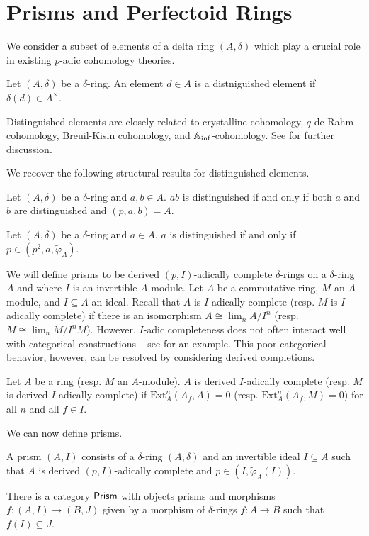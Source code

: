 \section{Prisms and Perfectoid Rings}\label{sec: prisms}
We consider a subset of elements of a delta ring $(A,\delta)$ which play a crucial role in existing $p$-adic cohomology theories. 
\begin{definition}\label{def: distinguished element}
    Let $(A,\delta)$ be a $\delta$-ring. An element $d\in A$ is a distniguished element if $\delta(d)\in A^{\times}$. 
\end{definition}
Distinguished elements are closely related to crystalline cohomology, $q$-de Rahm cohomology, Breuil-Kisin cohomology, and $\mathbb{A}_{\inf}$-cohomology. See \cite[Ex. 5.13-16]{Kedlaya} for further discussion. 

We recover the following structural results for distinguished elements. 
\begin{lemma}\label{lem: product distinguished iff factors distinguished}
    Let $(A,\delta)$ be a $\delta$-ring and $a,b\in A$. $ab$ is distinguished if and only if both $a$ and $b$ are distinguished and $(p,a,b)=A$. 
\end{lemma}
\begin{lemma}\label{lem: distinguished iff p is in an ideal}
    Let $(A,\delta)$ be a $\delta$-ring and $a\in A$. $a$ is distinguished if and only if $p\in(p^{2},a,\widetilde{\varphi}_{A})$. 
\end{lemma}

We will define prisms to be derived $(p,I)$-adically complete $\delta$-rings on a $\delta$-ring $A$ and where $I$ is an invertible $A$-module. Let $A$ be a commutative ring, $M$ an $A$-module, and $I\subseteq A$ an ideal. Recall that $A$ is $I$-adically complete (resp. $M$ is $I$-adically complete) if there is an isomorphism $A\cong \lim_{n}A/I^{n}$ (resp. $M\cong\lim_{n}M/I^{n}M$). However, $I$-adic completeness does not often interact well with categorical constructions -- see \cite[\href{https://stacks.math.columbia.edu/tag/05JD}{Tag 05JD}]{stacks-project} for an example. This poor categorical behavior, however, can be resolved by considering derived completions. 
\begin{definition}\label{def: derived complete}
    Let $A$ be a ring (resp. $M$ an $A$-module). $A$ is derived $I$-adically complete (resp. $M$ is derived $I$-adically complete) if $\mathrm{Ext}^{n}_{A}(A_{f},A)=0$ (resp. $\mathrm{Ext}^{n}_{A}(A_{f},M)=0$) for all $n$ and all $f\in I$. 
\end{definition}
We can now define prisms. 
\begin{definition}[Prism]\label{def: prism}
    A prism $(A,I)$ consists of a $\delta$-ring $(A,\delta)$ and an invertible ideal $I\subseteq A$ such that $A$ is derived $(p,I)$-adically complete and $p\in(I,\widetilde{\varphi}_{A}(I))$. 
\end{definition}
There is a category $\mathsf{Prism}$ with objects prisms and morphisms $f:(A,I)\to(B,J)$ given by a morphism of $\delta$-rings $f:A\to B$ such that $f(I)\subseteq J$. 

